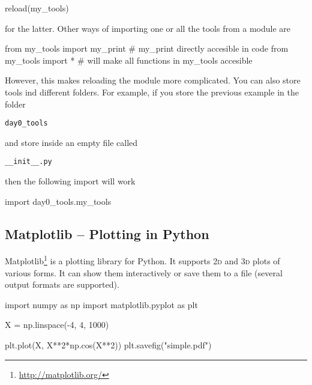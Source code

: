 \begin{python}
reload(my_tools)
\end{python}

\noindent for the latter. Other ways of importing one or all the tools from a module are

\begin{python}
from my_tools import my_print  # my_print directly accesible in code
from my_tools import *         # will make all functions  in my_tools accesible
\end{python}

\noindent However, this makes reloading the module more complicated. You can also store tools ind different folders. For example, if you store the previous
example in the folder

\begin{verbatim}
day0_tools
\end{verbatim}

\noindent and store inside an empty file called  

\begin{verbatim}
__init__.py
\end{verbatim}

\noindent then the following import will work

\begin{python}
import day0_tools.my_tools
\end{python}


\subsection{Matplotlib -- Plotting in Python}

Matplotlib\footnote{\url{http://matplotlib.org/}} is a plotting library for Python. It supports \textsc{2d} and \textsc{3d} plots of various forms. It can show them interactively or save them to a file (several output formats are supported).

\begin{python}
import numpy as np
import matplotlib.pyplot as plt

X = np.linspace(-4, 4, 1000)

plt.plot(X, X**2*np.cos(X**2))
plt.savefig("simple.pdf")
\end{python}

